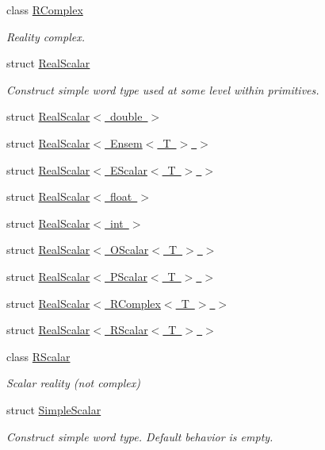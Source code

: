 \begin{DoxyCompactItemize}
class \mbox{\hyperlink{classENSEM_1_1RComplex}{R\+Complex}}
\begin{DoxyCompactList}\small\item\em Reality complex. \end{DoxyCompactList}\item 
struct \mbox{\hyperlink{structENSEM_1_1RealScalar}{Real\+Scalar}}
\begin{DoxyCompactList}\small\item\em Construct simple word type used at some level within primitives. \end{DoxyCompactList}\item 
struct \mbox{\hyperlink{structENSEM_1_1RealScalar_3_01double_01_4}{Real\+Scalar$<$ double $>$}}
\item 
struct \mbox{\hyperlink{structENSEM_1_1RealScalar_3_01Ensem_3_01T_01_4_01_4}{Real\+Scalar$<$ Ensem$<$ T $>$ $>$}}
\item 
struct \mbox{\hyperlink{structENSEM_1_1RealScalar_3_01EScalar_3_01T_01_4_01_4}{Real\+Scalar$<$ E\+Scalar$<$ T $>$ $>$}}
\item 
struct \mbox{\hyperlink{structENSEM_1_1RealScalar_3_01float_01_4}{Real\+Scalar$<$ float $>$}}
\item 
struct \mbox{\hyperlink{structENSEM_1_1RealScalar_3_01int_01_4}{Real\+Scalar$<$ int $>$}}
\item 
struct \mbox{\hyperlink{structENSEM_1_1RealScalar_3_01OScalar_3_01T_01_4_01_4}{Real\+Scalar$<$ O\+Scalar$<$ T $>$ $>$}}
\item 
struct \mbox{\hyperlink{structENSEM_1_1RealScalar_3_01PScalar_3_01T_01_4_01_4}{Real\+Scalar$<$ P\+Scalar$<$ T $>$ $>$}}
\item 
struct \mbox{\hyperlink{structENSEM_1_1RealScalar_3_01RComplex_3_01T_01_4_01_4}{Real\+Scalar$<$ R\+Complex$<$ T $>$ $>$}}
\item 
struct \mbox{\hyperlink{structENSEM_1_1RealScalar_3_01RScalar_3_01T_01_4_01_4}{Real\+Scalar$<$ R\+Scalar$<$ T $>$ $>$}}
\item 
class \mbox{\hyperlink{classENSEM_1_1RScalar}{R\+Scalar}}
\begin{DoxyCompactList}\small\item\em Scalar reality (not complex) \end{DoxyCompactList}\item 
struct \mbox{\hyperlink{structENSEM_1_1SimpleScalar}{Simple\+Scalar}}
\begin{DoxyCompactList}\small\item\em Construct simple word type. Default behavior is empty. \end{DoxyCompactList}\item 

\end{DoxyCompactItemize}

